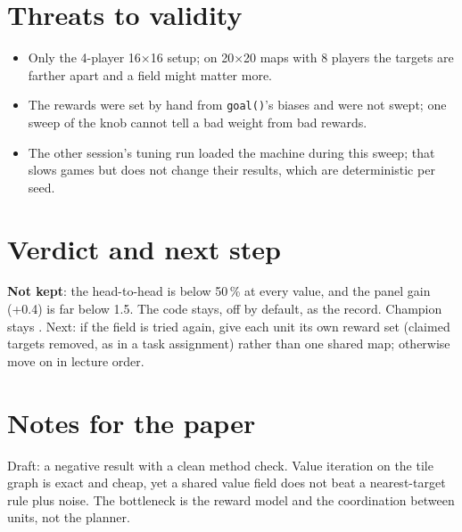 \documentclass{../polyexp}
\begin{document}
\section{Threats to validity}
\begin{itemize}
\item Only the 4-player 16×16 setup; on 20×20 maps with 8 players the targets are farther apart and a field might matter more.
\item The rewards were set by hand from \texttt{goal()}'s biases and were not swept; one sweep of the knob cannot tell a bad weight from bad rewards.
\item The other session's tuning run loaded the machine during this sweep; that slows games but does not change their results, which are deterministic per seed.
\end{itemize}

\section{Verdict and next step}
\textbf{Not kept}: the head-to-head is below 50\,\% at every value, and the panel gain (+0.4) is far below 1.5. The code stays, off by default, as the record. Champion stays . Next: if the field is tried again, give each unit its own reward set (claimed targets removed, as in a task assignment) rather than one shared map; otherwise move on in lecture order.

\section{Notes for the paper}
Draft: a negative result with a clean method check. Value iteration on the tile graph is exact and cheap, yet a shared value field does not beat a nearest-target rule plus noise. The bottleneck is the reward model and the coordination between units, not the planner.

\end{document}
